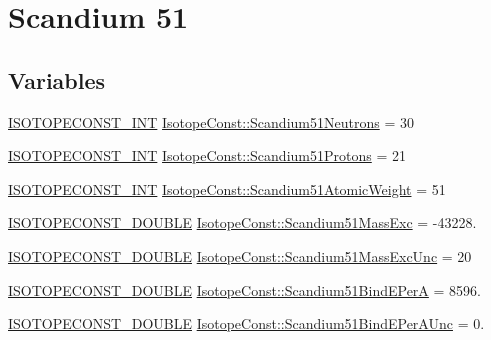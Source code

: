 \hypertarget{group___isotope_const-_scandium-_sc51}{}\section{Scandium 51}
\label{group___isotope_const-_scandium-_sc51}
\subsection*{Variables}
\begin{DoxyCompactItemize}
\item 
\mbox{\hyperlink{group___isotope_const-_macros_ga5f18360b3e99483a35c32d789e62621c}{I\+S\+O\+T\+O\+P\+E\+C\+O\+N\+S\+T\+\_\+\+I\+NT}} \mbox{\hyperlink{group___isotope_const-_scandium-_sc51_ga8da8f030adb489b59c5dcafed8beeabb}{Isotope\+Const\+::\+Scandium51\+Neutrons}} = 30
\item 
\mbox{\hyperlink{group___isotope_const-_macros_ga5f18360b3e99483a35c32d789e62621c}{I\+S\+O\+T\+O\+P\+E\+C\+O\+N\+S\+T\+\_\+\+I\+NT}} \mbox{\hyperlink{group___isotope_const-_scandium-_sc51_ga1967a10c240b39249a38944c8abe0148}{Isotope\+Const\+::\+Scandium51\+Protons}} = 21
\item 
\mbox{\hyperlink{group___isotope_const-_macros_ga5f18360b3e99483a35c32d789e62621c}{I\+S\+O\+T\+O\+P\+E\+C\+O\+N\+S\+T\+\_\+\+I\+NT}} \mbox{\hyperlink{group___isotope_const-_scandium-_sc51_gaa91954f4dd677dffe8b75f879c211f35}{Isotope\+Const\+::\+Scandium51\+Atomic\+Weight}} = 51
\item 
\mbox{\hyperlink{group___isotope_const-_macros_ga8f45a7272ce02c0b4c65c44636ed719a}{I\+S\+O\+T\+O\+P\+E\+C\+O\+N\+S\+T\+\_\+\+D\+O\+U\+B\+LE}} \mbox{\hyperlink{group___isotope_const-_scandium-_sc51_ga7c9cd7e4f77441bcc78f82f40eaf4060}{Isotope\+Const\+::\+Scandium51\+Mass\+Exc}} = -\/43228.
\item 
\mbox{\hyperlink{group___isotope_const-_macros_ga8f45a7272ce02c0b4c65c44636ed719a}{I\+S\+O\+T\+O\+P\+E\+C\+O\+N\+S\+T\+\_\+\+D\+O\+U\+B\+LE}} \mbox{\hyperlink{group___isotope_const-_scandium-_sc51_ga472100f32cae65cbac321110f3798acd}{Isotope\+Const\+::\+Scandium51\+Mass\+Exc\+Unc}} = 20
\item 
\mbox{\hyperlink{group___isotope_const-_macros_ga8f45a7272ce02c0b4c65c44636ed719a}{I\+S\+O\+T\+O\+P\+E\+C\+O\+N\+S\+T\+\_\+\+D\+O\+U\+B\+LE}} \mbox{\hyperlink{group___isotope_const-_scandium-_sc51_gaf34902fb41945b220d03df7fdfb58a43}{Isotope\+Const\+::\+Scandium51\+Bind\+E\+PerA}} = 8596.
\item 
\mbox{\hyperlink{group___isotope_const-_macros_ga8f45a7272ce02c0b4c65c44636ed719a}{I\+S\+O\+T\+O\+P\+E\+C\+O\+N\+S\+T\+\_\+\+D\+O\+U\+B\+LE}} \mbox{\hyperlink{group___isotope_const-_scandium-_sc51_ga86552fee6ce013ad2db671916a3f47bc}{Isotope\+Const\+::\+Scandium51\+Bind\+E\+Per\+A\+Unc}} = 0.

\end{DoxyCompactItemize}
